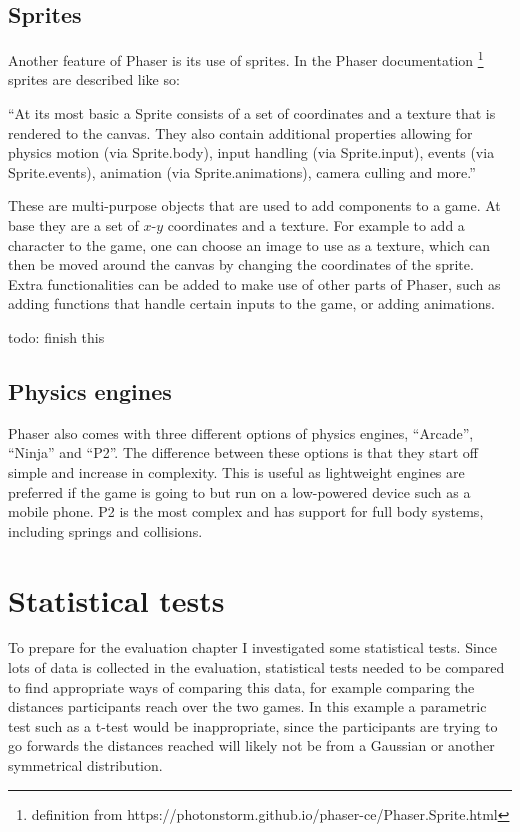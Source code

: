 \documentclass[12pt,a4paper,twoside,openright]{report}
\begin{document}
\subsection{Sprites}
\label{sprites}

Another feature of Phaser is its use of sprites.
In the Phaser documentation \footnote{definition from https://photonstorm.github.io/phaser-ce/Phaser.Sprite.html}
sprites are described like so:

\begin{displayquote}
``At its most basic a Sprite consists of a set of coordinates and a texture that is rendered to the canvas. They also contain additional properties allowing for physics motion (via Sprite.body), input handling (via Sprite.input), events (via Sprite.events), animation (via Sprite.animations), camera culling and more.''
\end{displayquote}

These are multi-purpose objects that are used to add components to a game. At base they are a set of $x$-$y$ coordinates and a texture. For example to add a character to the game, one can choose an image to use as a texture, which can then be moved around the canvas by changing the coordinates of the sprite.
Extra functionalities can be added to make use of other parts of Phaser, such as adding functions that handle certain inputs to the game, or adding animations.

todo: finish this

\subsection{Physics engines}
Phaser also comes with three different options of physics engines, ``Arcade'', ``Ninja'' and ``P2''. The difference between these options is that they start off simple and increase in complexity. This is useful as lightweight engines are preferred if the game is going to but run on a low-powered device such as a mobile phone. P2 is the most complex and has support for full body systems, including springs and collisions.


\section{Statistical tests}
\label{stats}
To prepare for the evaluation chapter I investigated some statistical tests. 
Since lots of data is collected in the evaluation, statistical tests needed to be compared to find appropriate ways of comparing this data, for example comparing the distances participants reach over the two games.
In this example a parametric test such as a t-test would be inappropriate, since the participants are trying to go forwards the distances reached will likely not be from a Gaussian or another symmetrical distribution.
\end{document}
